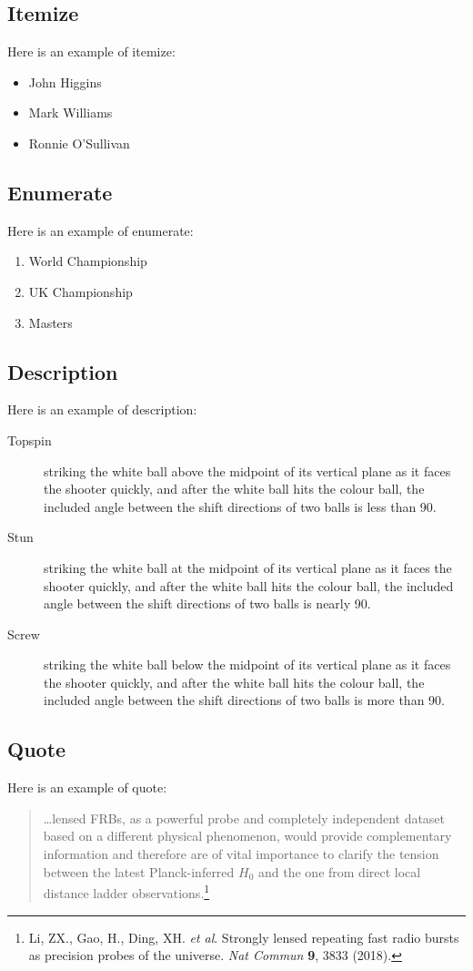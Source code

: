 \documentclass{article}
\begin{document}
    \subsection{Itemize}
    Here is an example of itemize:
    \begin{itemize}
        \item John Higgins
        \item Mark Williams
        \item Ronnie O'Sullivan
    \end{itemize}
    \subsection{Enumerate}
    Here is an example of enumerate:
    \begin{enumerate}
        \item World Championship
        \item UK Championship
        \item Masters
    \end{enumerate}
    \subsection{Description}
    Here is an example of description:
    \begin{description}
        \item[Topspin] striking the white ball above the midpoint of its
        vertical plane as it faces the shooter quickly, and after the white
        ball hits the colour ball, the included angle between the shift
        directions of two balls is less than 90\textdegree{}.
        \item[Stun] striking the white ball at the midpoint of its vertical
        plane as it faces the shooter quickly, and after the white ball hits
        the colour ball, the included angle between the shift directions of two
        balls is nearly 90\textdegree{}.
        \item[Screw] striking the white ball below the midpoint of its vertical
        plane as it faces the shooter quickly, and after the white ball hits
        the colour ball, the included angle between the shift directions of two
        balls is more than 90\textdegree{}.
    \end{description}
    \subsection{Quote}
    Here is an example of quote:
    \begin{quote}
        \dots lensed FRBs, as a powerful probe and completely independent
        dataset based on a different physical phenomenon, would provide
        complementary information and therefore are of vital importance to
        clarify the tension between the latest Planck-inferred $H_0$ and the
        one from direct local distance ladder observations.\footnote{
            Li, ZX., Gao, H., Ding, XH. \textit{et al}. Strongly lensed
            repeating fast radio bursts as precision probes of the universe.
            \textit{Nat Commun} \textbf{9}, 3833 (2018).}
    \end{quote}
\end{document}
